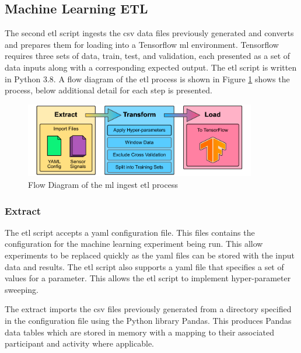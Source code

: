 \subsection{Machine Learning ETL}
\label{subsec:ML-ETL}
The second \acrshort{etl} script ingests the \acrshort{csv} data files previously generated and converts and prepares them for loading into a Tensorflow \acrshort{ml} environment. Tensorflow requires three sets of data, train, test, and validation, each presented as a set of data inputs along with a corresponding expected output. The \acrshort{etl} script is written in Python 3.8. A flow diagram of the \acrshort{etl} process is shown in Figure \ref{fig:methods_ml_ETL} shows the process, below additional detail for each step is presented.

\begin{figure}[hbt]
    \centering
    \includegraphics[width=0.9\textwidth]{content/3-Methods/ML_ETL.pdf}
    \caption[Flow Diagram of the  ingest  process]{Flow Diagram of the \acrlong{ml} ingest \acrshort{etl} process}
    \label{fig:methods_ml_ETL}
\end{figure}

\subsubsection{Extract}
The \acrshort{etl} script accepts a \acrshort{yaml} configuration file. This files contains the configuration for the machine learning experiment being run. This allow experiments to be replaced quickly as the \acrshort{yaml} files can be stored with the input data and results. The \acrshort{etl} script also supports a \acrshort{yaml} file that specifies a set of values for a parameter. This allows the \acrshort{etl} script to implement hyper-parameter sweeping.

The extract imports the \acrshort{csv} files previously generated from a directory specified in the configuration file using the Python library Pandas. This produces Pandas data tables which are stored in memory with a mapping to their associated participant and activity where applicable.

